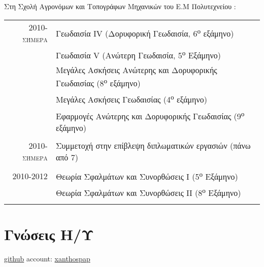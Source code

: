 \documentclass[a4paper,10pt]{article} %
\begin{document}
Στη Σχολή Αγρονόμων και Τοπογράφων Μηχανικών του Ε.Μ Πολυτεχνείου :

\begin{longtable}{rl}

\textsc{2010-σήμερα} & 
  Γεωδαισία IV (Δορυφορική Γεωδαισία, 6\textsuperscript{ο} εξάμηνο)\\
  & Γεωδαισία V (Ανώτερη Γεωδαισία, 5\textsuperscript{ο} Εξάμηνο)\\
  & Μεγάλες Ασκήσεις Ανώτερης και Δορυφορικής Γεωδαισίας (8\textsuperscript{ο} εξάμηνο)\\
  & Μεγάλες Ασκήσεις Γεωδαισίας (4\textsuperscript{ο} εξάμηνο)\\
  & Εφαρμογές Ανώτερης και Δορυφορικής Γεωδαισίας (9\textsuperscript{ο} εξάμηνο)\\
&\\

\textsc{2010-σήμερα} & 
  Συμμετοχή στην επίβλεψη διπλωματικών εργασιών (πάνω από 7)\\
&\\

\textsc{2010-2012} & 
  Θεωρία Σφαλμάτων και Συνορθώσεις Ι (5\textsuperscript{ο} Εξάμηνο)\\
  & Θεωρία Σφαλμάτων και Συνορθώσεις ΙΙ (8\textsuperscript{ο} Εξάμηνο)\\
&\\

\end{longtable}
\medskip

\section{Γνώσεις Η/Υ}

\hfill \href{https://github.com/}{github} account: \href{https://github.com/xanthospap}{xanthospap}
\end{document}

